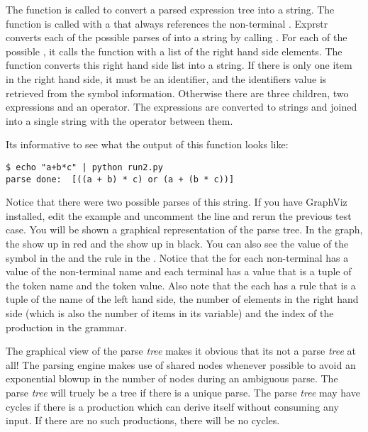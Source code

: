 The  function is called to convert a parsed expression tree
into a string.  The  function is called with a  that
always references the non-terminal .
Exprstr converts each of
the possible parses of  into a string by calling .
For each of the possible , it calls the 
function with a list of the right hand side elements.  The 
function converts this right hand side list into a string.  If there
is only one item in the right hand side, it must be an identifier, and
the identifiers value is retrieved from the symbol information.  Otherwise
there are three children, two expressions and an operator.  The expressions
are converted to strings and joined into a single string with the operator
between them.

Its informative to see what the output of this function looks like:

\begin{verbatim}
$ echo "a+b*c" | python run2.py
parse done:  [((a + b) * c) or (a + (b * c))]
\end{verbatim}

Notice that there were two possible parses of this string.  If you
have GraphViz installed, edit the  example and 
uncomment 
the line  and rerun the previous test case.
You will be shown a graphical representation of the parse tree.
In the graph, the  show up in red and the  show
up in black.  You can also see the value of the symbol in the 
and the rule in the .  Notice that the  for each
non-terminal has a  value of the non-terminal name and each terminal
has a  value that is a tuple of the token name and the token
value.  Also note that the each  has a rule that is a tuple
of the name of the left hand side, the number of elements in the right
hand side (which is also the number of items in its  variable)
and the index of the production in the grammar.

The graphical view of the parse {\em tree} makes it obvious that its
not a parse {\em tree} at all!  The parsing engine
makes use of shared nodes whenever possible to avoid an exponential
blowup in the number of nodes during an ambiguous parse.  The
parse {\em tree} will truely be a tree if there is a unique parse.  The 
parse {\em tree} may have cycles if there is a production which can 
derive itself without consuming any input.  If there are no such 
productions, there will be no cycles.


